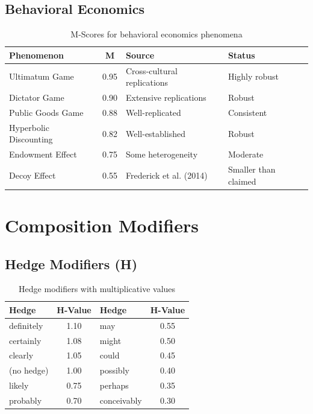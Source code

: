 \subsection{Behavioral Economics}

\begin{table}[H]
\centering
\small
\begin{tabular}{lcll}
\toprule
\textbf{Phenomenon} & \textbf{M} & \textbf{Source} & \textbf{Status} \\
\midrule
Ultimatum Game & 0.95 & Cross-cultural replications & Highly robust \\
Dictator Game & 0.90 & Extensive replications & Robust \\
Public Goods Game & 0.88 & Well-replicated & Consistent \\
Hyperbolic Discounting & 0.82 & Well-established & Robust \\
Endowment Effect & 0.75 & Some heterogeneity & Moderate \\
Decoy Effect & 0.55 & Frederick et al. (2014) & Smaller than claimed \\
\bottomrule
\end{tabular}
\caption{M-Scores for behavioral economics phenomena}
\end{table}


\section{Composition Modifiers}
\label{app:modifiers}

\subsection{Hedge Modifiers (H)}

\begin{table}[H]
\centering
\small
\begin{tabular}{lc|lc}
\toprule
\textbf{Hedge} & \textbf{H-Value} & \textbf{Hedge} & \textbf{H-Value} \\
\midrule
definitely & 1.10 & may & 0.55 \\
certainly & 1.08 & might & 0.50 \\
clearly & 1.05 & could & 0.45 \\
(no hedge) & 1.00 & possibly & 0.40 \\
likely & 0.75 & perhaps & 0.35 \\
probably & 0.70 & conceivably & 0.30 \\
\bottomrule
\end{tabular}
\caption{Hedge modifiers with multiplicative values}
\end{table}


